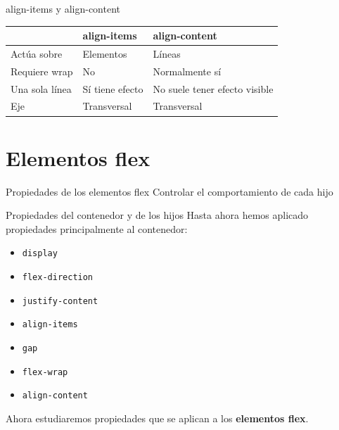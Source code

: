 \documentclass[aspectratio=169,11.5pt]{beamer}
\begin{document}
    \begin{frame}{align-items y align-content}
        \begin{center}
            \small
            \begin{tabular}{p{3.5cm}p{3.4cm}p{3.8cm}}
                \toprule
                & \textbf{align-items} & \textbf{align-content} \\
                \midrule

                Actúa sobre &
                Elementos &
                Líneas \\

                Requiere wrap &
                No &
                Normalmente sí \\

                Una sola línea &
                Sí tiene efecto &
                No suele tener efecto visible \\

                Eje &
                Transversal &
                Transversal \\

                \bottomrule
            \end{tabular}
        \end{center}
    \end{frame}



    \section{Elementos flex}

    \SectionSlide
    {Propiedades de los elementos flex}
    {Controlar el comportamiento de cada hijo}

    \begin{frame}{Propiedades del contenedor y de los hijos}
        Hasta ahora hemos aplicado propiedades
        principalmente al contenedor:

        \begin{itemize}
            \item \texttt{display}
            \item \texttt{flex-direction}
            \item \texttt{justify-content}
            \item \texttt{align-items}
            \item \texttt{gap}
            \item \texttt{flex-wrap}
            \item \texttt{align-content}
        \end{itemize}

        Ahora estudiaremos propiedades
        que se aplican a los \textbf{elementos flex}.
    \end{frame}
\end{document}
